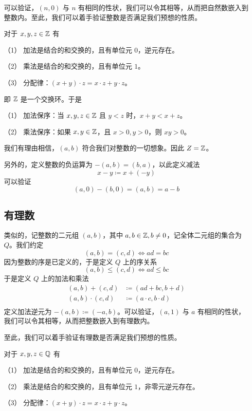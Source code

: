 可以验证，$(n,0)$ 与 $n$ 有相同的性状，我们可以令其相等，从而把自然数嵌入到整数内。至此，我们可以着手验证整数是否满足我们预想的性质。

\begin{theorem}[$\ZZ$ 的代数算律]
	对于 $x,y,z\in \mathbb{Z}$ 有

	（1） 加法是结合的和交换的，且有单位元 $0$，逆元存在。

	（2） 乘法是结合的和交换的，且有单位元 $1$。

	（3） 分配律：$(x+y) \cdot  z = x \cdot z + y\cdot z$。
\end{theorem}

即 $\ZZ$ 是一个交换环。于是

\begin{theorem}[$\ZZ$ 是有序域]
	（1） 加法保序：当 $x,y,z\in \mathbb{Z}$ 且 $y<z$ 时，$x+y<x+z$。

	（2） 乘法保序：如果 $x,y\in \mathbb{Z}$，且 $x>0,y>0$，则 $xy>0$。
\end{theorem}

我们有理由相信，$(a,b)$ 符合我们对整数的一切想象。因此 $Z = \mathbb{Z}$。

另外的，定义整数的负运算为 $-(a,b) = (b,a)$，以此定义减法
$$x - y \coloneqq  x + (-y)$$
可以验证
$$(a,0) - (b,0) = (a,b) = a - b$$

\subsection{有理数}

类似的，记整数的二元组 $(a,b)$，其中 $a,b\in \mathbb{Z},b\ne 0$，记全体二元组的集合为 $Q$。我们约定
$$(a,b) = (c,d) \Leftrightarrow ad = bc$$
因为整数的序是已定义的，于是定义 $Q$ 上的序关系
$$(a,b) \leqslant (c,d) \Leftrightarrow ad \leqslant bc$$
于是定义 $Q$ 上的加法和乘法
\begin{equation*}
	\begin{aligned}
		(a,b) + (c,d)     & \coloneqq  (ad+bc,b+d)           \\
		(a,b) \cdot (c,d) & \coloneqq  (a \cdot c,b \cdot d) \\
	\end{aligned}
\end{equation*}
定义加法逆元为 $-(a,b) \coloneqq  (-a,b)$。可以验证，$(a,1)$ 与 $a$ 有相同的性状，我们可以令其相等，从而把整数嵌入到有理数内。

至此，我们可以着手验证有理数是否满足我们预想的性质。

\begin{theorem}[$\QQ$ 的代数算律]
	对于 $x,y,z\in \mathbb{Q}$ 有

	（1） 加法是结合的和交换的，且有单位元 $0$，逆元存在。

	（2） 乘法是结合的和交换的，且有单位元 $1$，非零元逆元存在。

	（3） 分配律：$(x+y) \cdot  z = x \cdot z + y\cdot z$。
\end{theorem}

